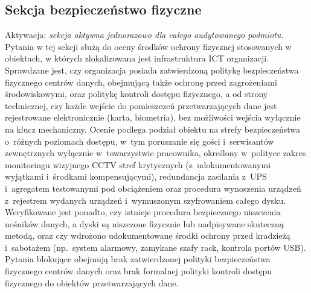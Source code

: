 \subsection{Sekcja bezpieczeństwo fizyczne}
\noindent Aktywacja: \textit{sekcja aktywna jednorazowo dla całego audytowanego podmiotu.}\\
Pytania w tej sekcji służą do oceny środków ochrony fizycznej stosowanych w obiektach, w których zlokalizowana jest infrastruktura ICT organizacji. Sprawdzane jest, czy organizacja posiada zatwierdzoną politykę bezpieczeństwa fizycznego centrów danych, obejmującą także ochronę przed zagrożeniami środowiskowymi, oraz politykę kontroli dostępu fizycznego, a od strony technicznej, czy każde wejście do pomieszczeń przetwarzających dane jest rejestrowane elektronicznie (karta, biometria), bez możliwości wejścia wyłącznie na klucz mechaniczny. Ocenie podlega podział obiektu na strefy bezpieczeństwa o~różnych poziomach dostępu, w~tym poruszanie się gości i~serwisantów zewnętrznych wyłącznie w~towarzystwie pracownika, określony w~polityce zakres monitoringu wizyjnego CCTV stref krytycznych (z~udokumentowanymi wyjątkami i~środkami kompensującymi), redundancja zasilania z~UPS i~agregatem testowanymi pod obciążeniem oraz procedura wynoszenia urządzeń z~rejestrem wydanych urządzeń i~wymuszonym szyfrowaniem całego dysku. Weryfikowane jest ponadto, czy istnieje procedura bezpiecznego niszczenia nośników danych, a dyski są niszczone fizycznie lub nadpisywane skuteczną metodą, oraz czy wdrożono udokumentowane środki ochrony przed kradzieżą i~sabotażem (np.\ system alarmowy, zamykane szafy rack, kontrola portów USB). Pytania blokujące obejmują brak zatwierdzonej polityki bezpieczeństwa fizycznego centrów danych oraz brak formalnej polityki kontroli dostępu fizycznego do obiektów przetwarzających dane.

